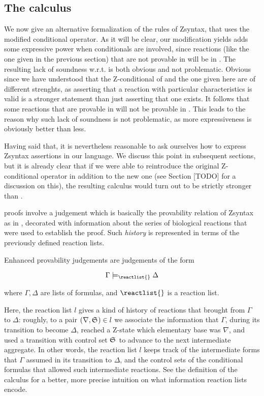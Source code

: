 \subsection{The calculus \eznd{}}

We now give an alternative formalization of the rules of Zsyntax, that uses the
modified conditional operator. As it will be clear, our modification yields
adds some expressive power when conditionals are involved, since reactions
(like the one given in the previous section) that are not provable in \znd{}
will be in \eznd{}.
The resulting lack of soundness w.r.t. \znd{} is both obvious and not
problematic. Obvious since we have understood that the Z-conditional of \znd{}
and the one given here are of different strenghts, as asserting that a reaction
with particular characteristics is valid is a stronger statement than just
asserting that one exists. It follows that some reactions that are provable in
\eznd{} will not be provable in \znd{}. This leads to the reason why such lack
of soundness is not problematic, as more expressiveness is obviously better than
less.

Having said that, it is nevertheless reasonable to ask ourselves how to
express Zsyntax assertions in our language. We discuss this point in subsequent
sections, but it is already clear that if we were able to reintroduce the
original Z-conditional operator in addition to the new one (see Section [TODO]
for a discussion on this), the resulting calculus would turn out to be strictly
stronger than \znd{}.

\eznd{} proofs involve a judgement which is basically the provability relation
of Zsyntax as in \cite{adding-logic}, decorated with information about the
series of biological reactions that were used to establish the proof. Such
\emph{history} is represented in terms of the previously defined reaction lists.

\begin{definition}
  Enhanced provability judgements are judgements of the form

  \[
    \Gamma \models_{\reactlist{}} \Delta
  \]

  where $\Gamma, \Delta$ are lists of formulas, and $\reactlist{}$ is a reaction
  list.
\end{definition}

Here, the reaction list $l$ gives a kind of history of reactions that brought
from $\Gamma$ to $\Delta$: roughly, to a pair $(\nabla, \mathfrak{S}_{}) \in l$ we
associate the information that $\Gamma$, during its transition to become
$\Delta$, reached a Z-state which elementary base was $\nabla$, and used a
transition with control set $\mathfrak{S}_{}$ to advance to the next intermediate
aggregate.  In other words, the reaction list $l$ keeps track of the
intermediate forms that $\Gamma$ assumed in its transition to $\Delta$, and the
control sets of the conditional formulas that allowed such intermediate
reactions. See the definition of the calculus for a better, more precise
intuition on what information reaction lists encode.

